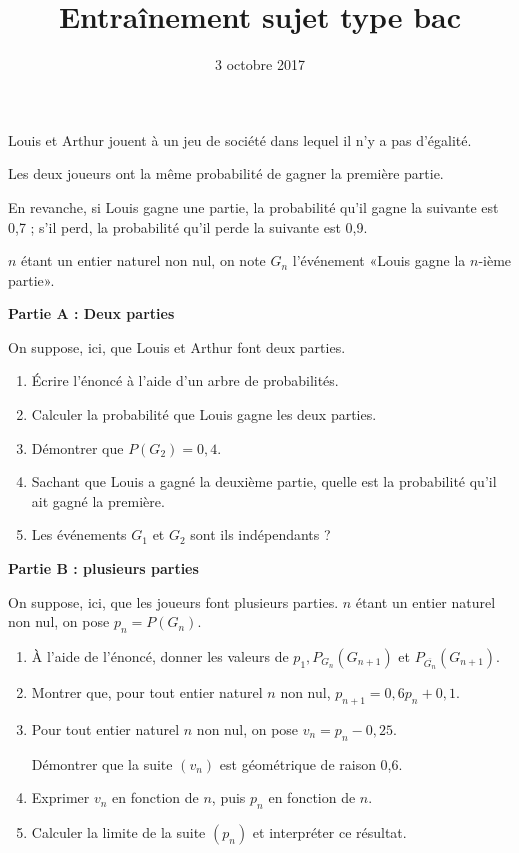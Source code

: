 \documentclass[12pt,french,a4paper]{article}
\title{Entraînement sujet type bac}
\date{3 octobre 2017}
\author{}
\begin{document}
\maketitle
\thispagestyle{fancy}

Louis et Arthur jouent à un jeu de société dans lequel il n’y a pas d’égalité.

Les deux joueurs ont la même probabilité de gagner la première partie.

En revanche, si Louis gagne une partie, la probabilité qu’il gagne la suivante est 0,7 ; s’il perd, la probabilité qu’il perde la suivante est 0,9.

$n$ étant un entier naturel non nul, on note $G_n$ l'événement «Louis
gagne la $n$-ième partie».

\textbf{Partie A : Deux parties}

On suppose, ici, que Louis et Arthur font deux parties.
\begin{enumerate}
  \item Écrire l'énoncé à l'aide d'un arbre de probabilités.
  \item Calculer la probabilité que Louis gagne les deux parties.
  \item Démontrer que $P(G_2) = 0,4$.
  \item Sachant que Louis a gagné la deuxième partie, quelle est la
    probabilité qu'il ait gagné la première.
  \item Les événements $G_1$ et $G_2$ sont ils indépendants ?
\end{enumerate}

\textbf{Partie B : plusieurs parties}

On suppose, ici, que les joueurs font plusieurs parties. $n$ étant un
entier naturel non nul, on pose $p_n = P(G_n)$.
\begin{enumerate}
  \item À l'aide de l'énoncé, donner les valeurs de $p_1,
    P_{G_n}(G_{n+1})$ et $P_{\overline{G_n}}(G_{n+1})$.
  \item Montrer que, pour tout entier naturel $n$ non nul, $p_{n+1} =
    0,6p_n +0,1$.
  \item Pour tout entier naturel $n$ non nul, on pose $v_n = p_n -
    0,25$.

    Démontrer que la suite $(v_n)$ est géométrique de raison 0,6.
  \item Exprimer $v_n$ en fonction de $n$, puis $p_n$ en fonction de
    $n$.
  \item Calculer la limite de la suite $(p_n)$ et interpréter ce
    résultat.
\end{enumerate}
\end{document}
